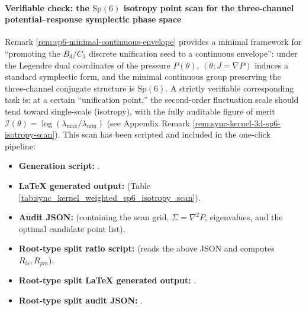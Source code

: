 \paragraph{Verifiable check: the \texorpdfstring{$\mathrm{Sp}(6)$}{Sp(6)} isotropy point scan for the three-channel potential--response symplectic phase space}
Remark \ref{rem:sp6-minimal-continuous-envelope} provides a minimal framework for ``promoting the \(B_3/C_3\) discrete unification seed to a continuous envelope'': under the Legendre dual coordinates of the pressure \(P(\theta)\),
\((\theta;J=\nabla P)\) induces a standard symplectic form, and the minimal continuous group preserving the three-channel conjugate structure is \(\mathrm{Sp}(6)\).
A strictly verifiable corresponding task is: at a certain ``unification point,'' the second-order fluctuation scale should tend toward single-scale (isotropy), with the fully auditable figure of merit
\(
\mathcal{I}(\theta)=\log(\lambda_{\max}/\lambda_{\min})
\)
(see Appendix Remark \ref{rem:sync-kernel-3d-sp6-isotropy-scan}).
This scan has been scripted and included in the one-click pipeline:
\begin{itemize}
  \item \textbf{Generation script:} \texttt{}.
  \item \textbf{LaTeX generated output:} \texttt{} (Table \ref{tab:sync_kernel_weighted_sp6_isotropy_scan}).
  \item \textbf{Audit JSON:} \texttt{} (containing the scan grid, \(\Sigma=\nabla^2P\), eigenvalues, and the optimal candidate point list).
  \item \textbf{Root-type split ratio script:} \texttt{} (reads the above JSON and computes \(R_{ls},R_{pm}\)).
  \item \textbf{Root-type split LaTeX generated output:} \texttt{}.
  \item \textbf{Root-type split audit JSON:} \texttt{}.
\end{itemize}

